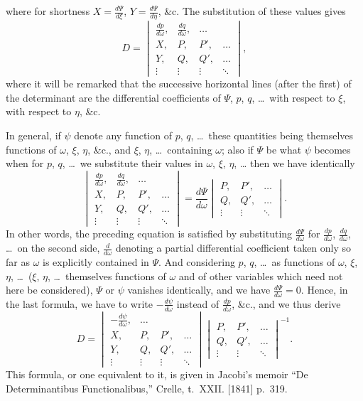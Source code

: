 \documentclass[11pt,a4paper]{article}
\theoremstyle{definition}
\begin{document}
\newpage

\setcounter{page}{440}

where for shortness $X = \frac{d\Psi}{d\xi}$, $Y = \frac{d\Psi}{d\eta}$, \&c. The substitution of these values gives
\[
D = \begin{vmatrix}
\frac{dp}{d\omega}, & \frac{dq}{d\omega}, & \ldots \\
X, & P, & P', & \ldots \\
Y, & Q, & Q', & \ldots \\
\vdots & \vdots & \vdots & \ddots
\end{vmatrix},
\]
where it will be remarked that the successive horizontal lines (after the first) of the determinant are the differential coefficients of $\Psi$, $p$, $q$, \ldots\ with respect to $\xi$, with respect to $\eta$, \&c.

In general, if $\psi$ denote any function of $p$, $q$, \ldots\ these quantities being themselves functions of $\omega$, $\xi$, $\eta$, \&c., and $\xi$, $\eta$, \ldots\ containing $\omega$; also if $\Psi$ be what $\psi$ becomes when for $p$, $q$, \ldots\ we substitute their values in $\omega$, $\xi$, $\eta$, \ldots\; then we have identically
\[
\begin{vmatrix}
\frac{dp}{d\omega}, & \frac{dq}{d\omega}, & \ldots \\
X, & P, & P', & \ldots \\
Y, & Q, & Q', & \ldots \\
\vdots & \vdots & \vdots & \ddots
\end{vmatrix}
= \frac{d\Psi}{d\omega}\begin{vmatrix}
P, & P', & \ldots \\
Q, & Q', & \ldots \\
\vdots & \vdots & \ddots
\end{vmatrix}.
\]
In other words, the preceding equation is satisfied by substituting $\frac{d\Psi}{d\omega}$ for $\frac{dp}{d\omega}$, $\frac{dq}{d\omega}$, \ldots\ on the second side, $\frac{d}{d\omega}$ denoting a partial differential coefficient taken only so far as $\omega$ is explicitly contained in $\Psi$. And considering $p$, $q$, \ldots\ as functions of $\omega$, $\xi$, $\eta$, \ldots\ ($\xi$, $\eta$, \ldots\ themselves functions of $\omega$ and of other variables which need not here be considered), $\Psi$ or $\psi$ vanishes identically, and we have $\frac{d\Psi}{d\omega} = 0$. Hence, in the last formula, we have to write $-\frac{d\psi}{d\omega}$ instead of $\frac{dp}{d\omega}$, \&c., and we thus derive
\[
D = \begin{vmatrix}
-\frac{d\psi}{d\omega}, & \ldots \\
X, & P, & P', & \ldots \\
Y, & Q, & Q', & \ldots \\
\vdots & \vdots & \vdots & \ddots
\end{vmatrix}
\begin{vmatrix}
P, & P', & \ldots \\
Q, & Q', & \ldots \\
\vdots & \vdots & \ddots
\end{vmatrix}^{-1}.
\]
This formula, or one equivalent to it, is given in Jacobi's memoir ``De Determinantibus Functionalibus,'' Crelle, t.~XXII. [1841] p.~319.
\end{document}
